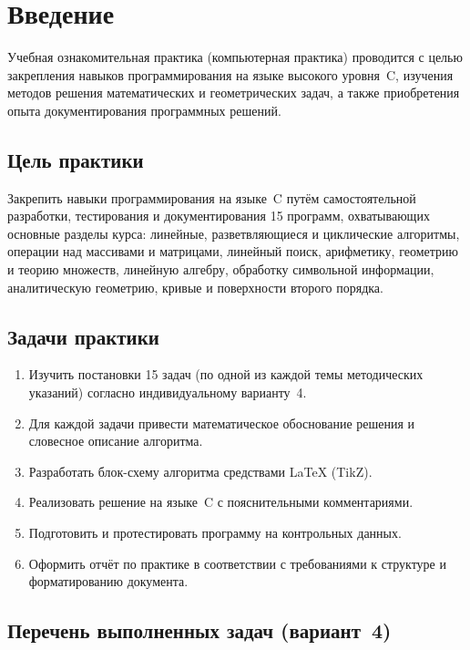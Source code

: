 \section{Введение}

Учебная ознакомительная практика (компьютерная практика) проводится
с целью закрепления навыков программирования на языке высокого
уровня~C, изучения методов решения математических и геометрических
задач, а также приобретения опыта документирования программных
решений.

\subsection{Цель практики}

Закрепить навыки программирования на языке~C путём самостоятельной
разработки, тестирования и документирования 15 программ, охватывающих
основные разделы курса: линейные, разветвляющиеся и циклические
алгоритмы, операции над массивами и матрицами, линейный поиск,
арифметику, геометрию и теорию множеств, линейную алгебру,
обработку символьной информации, аналитическую геометрию,
кривые и поверхности второго порядка.

\subsection{Задачи практики}

\begin{enumerate}
  \item Изучить постановки 15 задач (по одной из каждой темы методических
        указаний) согласно индивидуальному варианту~4.
  \item Для каждой задачи привести математическое обоснование решения
        и словесное описание алгоритма.
  \item Разработать блок-схему алгоритма средствами \LaTeX{} (TikZ).
  \item Реализовать решение на языке~C с пояснительными комментариями.
  \item Подготовить и протестировать программу на контрольных данных.
  \item Оформить отчёт по практике в соответствии с требованиями
        к структуре и форматированию документа.
\end{enumerate}

\subsection{Перечень выполненных задач (вариант~4)}

